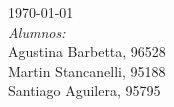 \begin{titlepage}
{\large \today}\\[1cm] %
\Large \emph{Alumnos:}\\
Agustina Barbetta, \textsc{96528}\\
Martin Stancanelli, \textsc{95188}\\ 
Santiago Aguilera, \textsc{95795}\\[3cm]

\vfill %

\end{titlepage}